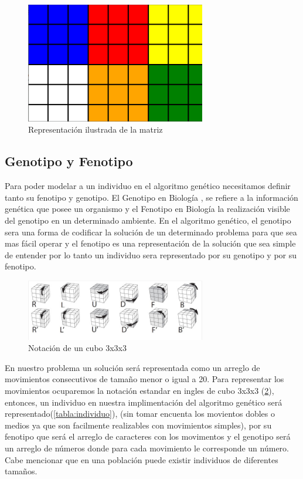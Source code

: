 \documentclass[oneside,10pt]{article}
\begin{document}
\begin{figure}
  \begin{center}
  \includegraphics[width=0.7\textwidth]{migrafico}
  \caption{Representaci\'on ilustrada de la matriz}
  \label{fig:ejemplo}
  \end{center}
\end{figure}

\subsection{Genotipo y Fenotipo}
Para poder modelar a un individuo en el algoritmo gen\'etico necesitamos definir tanto su fenotipo y genotipo.
El Genotipo en Biolog\'ia , se refiere a la informaci\'on gen\'etica que posee un organismo y el Fenotipo en Biolog\'ia la realizaci\'on visible del genotipo en un determinado ambiente. En el algoritmo gen\'etico, el genotipo sera una forma de codificar la soluci\'on de un determinado problema para que sea mas f\'acil operar y el fenotipo es una representaci\'on de la soluci\'on que sea simple de entender por lo tanto un individuo sera representado por su genotipo y por su fenotipo.\\

\begin{figure}
  \begin{center}
  \includegraphics[width=0.7\textwidth]{notacion}
  \caption{Notaci\'on de un cubo 3x3x3 }
  \label{fig:move}
  \end{center}
\end{figure}

En nuestro problema un soluci\'on ser\'a representada como un arreglo de movimientos consecutivos de tama\~no menor o igual a 20. Para representar los movimientos ocuparemos la notaci\'on estandar en ingles de cubo 3x3x3 (\ref{fig:move}), entonces, un individuo en nuestra implimentaci\'on del algoritmo gen\'etico ser\'a representado(\ref{tabla:individuo}), (sin tomar encuenta los movientos dobles o medios ya que son facilmente realizables con movimientos simples), por su fenotipo que ser\'a el arreglo de caracteres con los movimentos y el genotipo ser\'a un arreglo de n\'umeros donde para cada movimiento le corresponde un n\'umero. Cabe mencionar que en una poblaci\'on puede existir individuos de diferentes tama\~nos.
\end{document}
